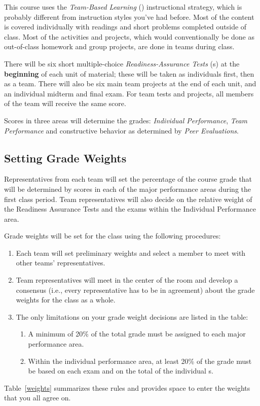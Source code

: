 This course uses the \emph{Team-Based Learning} (\TBL) instructional
strategy, which is probably different from instruction styles you've
had before. Most of the content is covered individually with readings
and short problems completed outside of class.  Most of the activities
and projects, which would conventionally be done as out-of-class
homework and group projects, are done in teams during class.

There will be six short multiple-choice \emph{Readiness-Assurance
  Tests} (\RAT s) at the \textbf{beginning} of each unit of material;
these will be taken as individuals first, then as a team. There will
also be six main team projects at the end of each unit, and an
individual midterm and final exam. For team tests and projects, all
members of the team will receive the same score.

Scores in three areas will determine the grades: \emph{Individual
  Performance}, \emph{Team Performance} and constructive behavior as
determined by \emph{Peer Evaluations}.

\subsection{Setting Grade Weights}

Representatives from each team will set the percentage of the course
grade that will be determined by scores in each of the major
performance areas during the first class period. Team representatives
will also decide on the relative weight of the Readiness Assurance
Tests and the exams within the Individual Performance area.

Grade weights will be set for the class using the following
procedures:
\begin{enumerate}
\item Each team will set preliminary weights and select a member to
  meet with other teams' representatives.
\item Team representatives will meet in the center of the room and
  develop a consensus (i.e., every representative has to be in
  agreement) about the grade weights for the class as a whole.
\item The only limitations on your grade weight decisions are listed
  in the table:
  \begin{enumerate}
  \item A minimum of 20\% of the total grade must be assigned to each
    major performance area.
  \item Within the individual performance area, at least 20\% of the
    grade must be based on each exam and on the total of the
    individual \RAT s.
  \end{enumerate}
\end{enumerate}
Table~\ref{weights} summarizes these rules and provides space to enter
the weights that you all agree on.

